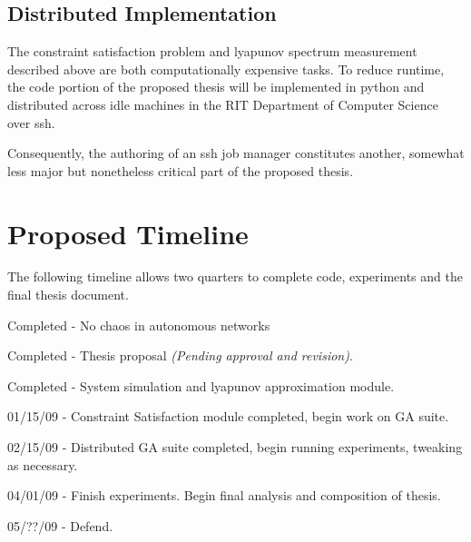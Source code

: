 \documentclass[12pt]{article}
\begin{document}
\subsection{Distributed Implementation}
The constraint satisfaction problem and lyapunov spectrum measurement described
above are both computationally expensive tasks.  To reduce runtime, the code
portion of the proposed thesis will be implemented in python and distributed
across idle machines in the RIT Department of Computer Science over ssh.

Consequently, the authoring of an ssh job manager constitutes another, somewhat
less major but nonetheless critical part of the proposed thesis.
\newpage
\section{Proposed Timeline}
The following timeline allows two quarters to complete code, experiments and the final thesis document.

Completed - No chaos in autonomous networks

Completed - Thesis proposal \textit{(Pending approval and revision)}.

Completed - System simulation and lyapunov approximation module.

01/15/09 - Constraint Satisfaction module completed, begin work on GA suite.

02/15/09 - Distributed GA suite completed, begin running experiments, tweaking as necessary.

04/01/09 - Finish experiments.  Begin final analysis and composition of thesis.

05/??/09 - Defend.
\end{document}

